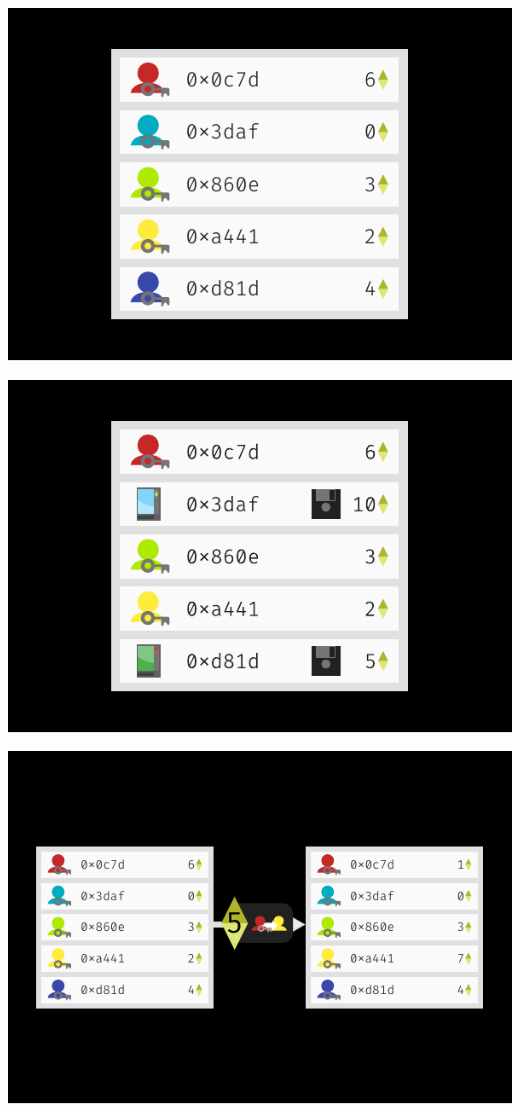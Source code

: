 \documentclass[xcolor=x11names,compress]{beamer}
\begin{document}
\begin{frame}
\begin{overprint}
\begin{center}
			\includegraphics[width=\textwidth,height=0.8\textheight,keepaspectratio]{img/state/05.pdf}
		\end{center}
		\begin{center}
			\includegraphics[width=\textwidth,height=0.8\textheight,keepaspectratio]{img/state/06.pdf}
		\end{center}
		\begin{center}
			\includegraphics[width=\textwidth,height=0.8\textheight,keepaspectratio]{img/state/08.pdf}

\end{center}
\end{overprint}
\end{frame}
\end{document}
